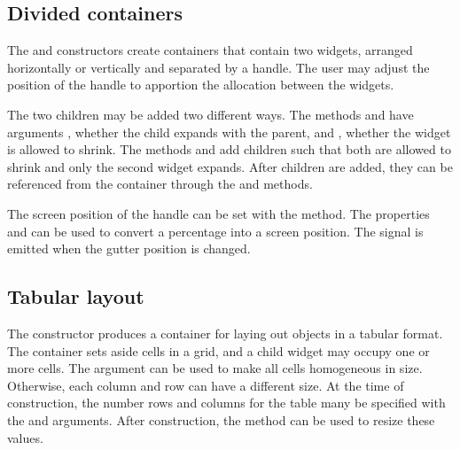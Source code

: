 \subsection{Divided containers}
\label{sec:RGtk2:gtkPanedWindow}

The  and  constructors create
containers that contain two widgets, arranged horizontally or
vertically and separated by a handle.  The user may adjust the
position of the handle to apportion the allocation between the
widgets.

The two children may be added two different ways. The methods
 and  have arguments
, whether the child expands with the
parent, and , whether the widget is
allowed to shrink. The methods  and
 add children such that both are allowed to
shrink and only the second widget expands.  After children are added,
they can be referenced from the container through the
 and  methods.

The screen position of the handle can be set with the
 method.  The properties
 and  can be used to convert a
percentage into a screen position. The  signal is
emitted when the gutter position is changed.




\subsection{Tabular layout}
\label{sec:RGtk2:gtkTable}

The  constructor produces a container for laying
out objects in a tabular format. The container sets aside cells in a
grid, and a child widget may occupy one or more cells. The
 argument can be used to make all
cells homogeneous in size. Otherwise, each column and row can have a
different size. At the time of construction, the number rows and
columns for the table many be specified with the
 and 
arguments. After construction, the  method
can be used to resize these values.

